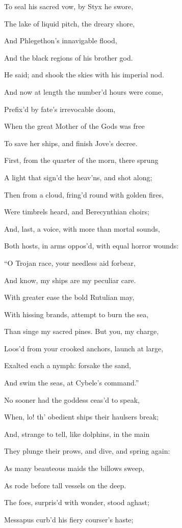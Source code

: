 To seal his sacred vow, by Styx he swore,

The lake of liquid pitch, the dreary shore,

And Phlegethon’s innavigable flood,

And the black regions of his brother god.

He said; and shook the skies with his imperial nod.

And now at length the number’d hours were come,

Prefix’d by fate’s irrevocable doom,

When the great Mother of the Gods was free

To save her ships, and finish Jove’s decree.

First, from the quarter of the morn, there sprung

A light that sign’d the heav’ns, and shot along;

Then from a cloud, fring’d round with golden fires,

Were timbrels heard, and Berecynthian choirs;

And, last, a voice, with more than mortal sounds,

Both hosts, in arms oppos’d, with equal horror wounds:

“O Trojan race, your needless aid forbear,

And know, my ships are my peculiar care.

With greater ease the bold Rutulian may,

With hissing brands, attempt to burn the sea,

Than singe my sacred pines. But you, my charge,

Loos’d from your crooked anchors, launch at large,

Exalted each a nymph: forsake the sand,

And swim the seas, at Cybele’s command.”

No sooner had the goddess ceas’d to speak,

When, lo! th’ obedient ships their haulsers break;

And, strange to tell, like dolphins, in the main

They plunge their prows, and dive, and spring again:

As many beauteous maids the billows sweep,

As rode before tall vessels on the deep.

The foes, surpris’d with wonder, stood aghast;

Messapus curb’d his fiery courser’s haste;

